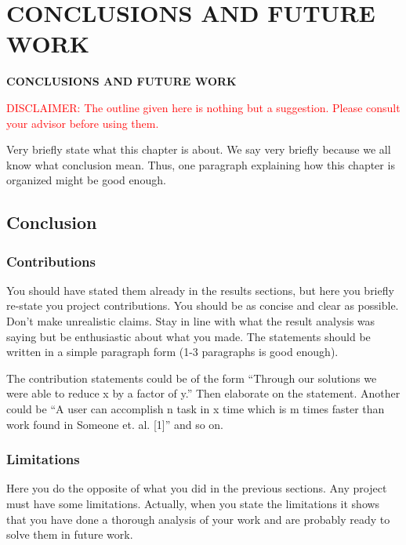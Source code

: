 \chapter{CONCLUSIONS AND FUTURE WORK}
\pagebreak

\begin{center}
{\LARGE\textbf{CONCLUSIONS AND FUTURE WORK}}
\end{center}

\textcolor{red}{DISCLAIMER: The outline given here is nothing but a suggestion. Please consult your advisor before using them.}

Very briefly state what this chapter is about. We say very briefly because we all know what conclusion mean. Thus, one paragraph explaining how this chapter is organized might be good enough.


\section{Conclusion} %
\label{sec:conclusion}


\subsection{Contributions} %
\label{sub:contributions}

You should have stated them already in the results sections, but here you briefly re-state you project contributions. You should be as concise and clear as possible. Don't make unrealistic claims. Stay in line with what the result analysis was saying but be enthusiastic about what you made. The statements should be written in a simple paragraph form (1-3 paragraphs is good enough). 

The contribution statements could be of the form ``Through our solutions we were able to reduce x by a factor of y.'' Then elaborate on the statement. Another could be ``A user can accomplish n task in x time which is m times faster than work found in Someone et. al. [1]'' and so on. 



\subsection{Limitations} %
\label{sub:limitations}

Here you do the opposite of what you did in the previous sections. Any project must have some limitations. Actually, when you state the limitations it shows that you have done a thorough analysis of your work and are probably ready to solve them in future work. 

